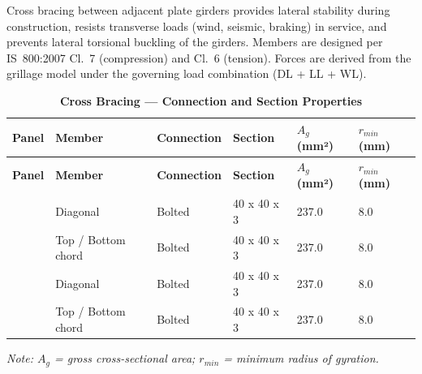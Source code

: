 \documentclass[12pt,a4paper]{report}
\numberwithin{table}{chapter}
\numberwithin{figure}{chapter}
\begin{document}
Cross bracing between adjacent plate girders provides lateral stability during construction, resists transverse loads (wind, seismic, braking) in service, and prevents lateral torsional buckling of the girders. Members are designed per IS~800:2007 Cl.~7 (compression) and Cl.~6 (tension). Forces are derived from the grillage model under the governing load combination  (DL + LL + WL).

\vspace{1em}

\vspace{0.4em}
\noindent
\setlength{\tabcolsep}{4pt}
\setlength\LTleft{0pt}
\setlength\LTright{\fill}

\begin{longtable}{|C{2.0cm}|L{2.0cm}|L{2.2cm}|C{2.5cm}|C{2.0cm}|C{2.0cm}|}
\caption{\textbf{Cross Bracing --- Connection and Section Properties}}
\hline
\textbf{Panel} & \textbf{Member} & \textbf{Connection} & \textbf{Section} & \textbf{$A_g$ (mm²)} & \textbf{$r_{min}$ (mm)} \\[6pt]
\hline
\endfirsthead

\hline
\textbf{Panel} & \textbf{Member} & \textbf{Connection} & \textbf{Section} & \textbf{$A_g$ (mm²)} & \textbf{$r_{min}$ (mm)} \\[6pt]
\hline
\endhead
{} & Diagonal & Bolted & 40 x 40 x 3 & 237.0 & 8.0 \\[6pt]
 & Top / Bottom chord & Bolted & 40 x 40 x 3 & 237.0 & 8.0 \\[6pt]
\hline
{} & Diagonal & Bolted & 40 x 40 x 3 & 237.0 & 8.0 \\[6pt]
 & Top / Bottom chord & Bolted & 40 x 40 x 3 & 237.0 & 8.0 \\[6pt]
\hline
\end{longtable}
\noindent\textit{Note: $A_g$ = gross cross-sectional area; $r_{min}$ = minimum radius of gyration.}
\end{document}
